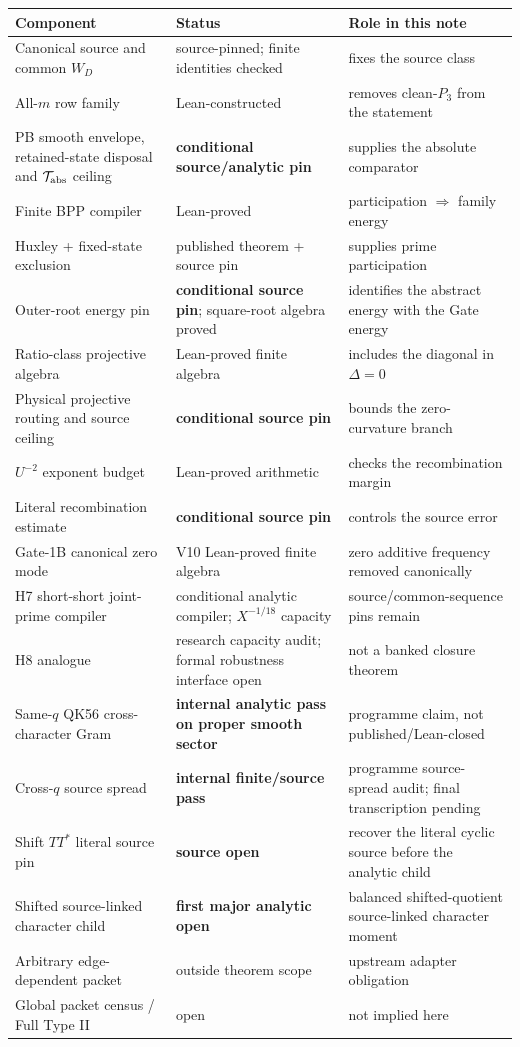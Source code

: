 \documentclass[11pt]{article}
\theoremstyle{definition}
\newcommand{\1}{\mathbf 1}
\begin{document}
\begin{center}
\begin{tabular}{p{} p{} p{}}
\toprule
Component & Status & Role in this note\\
\midrule
Canonical source and common $W_D$ & source-pinned; finite identities checked & fixes the source class\\
All-$m$ row family & Lean-constructed & removes clean-$P_3$ from the statement\\
PB smooth envelope, retained-state disposal and $\mathcal T_{\rm abs}$ ceiling & \textbf{conditional source/analytic pin} & supplies the absolute comparator\\
Finite BPP compiler & Lean-proved & participation $\Rightarrow$ family energy\\
Huxley + fixed-state exclusion & published theorem + source pin & supplies prime participation\\
Outer-root energy pin & \textbf{conditional source pin}; square-root algebra proved & identifies the abstract energy with the Gate energy\\
Ratio-class projective algebra & Lean-proved finite algebra & includes the diagonal in $\Delta=0$\\
Physical projective routing and source ceiling & \textbf{conditional source pin} & bounds the zero-curvature branch\\
$U^{-2}$ exponent budget & Lean-proved arithmetic & checks the recombination margin\\
Literal recombination estimate & \textbf{conditional source pin} & controls the source error\\
Gate-1B canonical zero mode & V10 Lean-proved finite algebra & zero additive frequency removed canonically\\
H7 short-short joint-prime compiler & conditional analytic compiler; $X^{-1/18}$ capacity & source/common-sequence pins remain\\
H8 analogue & research capacity audit; formal robustness interface open & not a banked closure theorem\\
Same-$q$ QK56 cross-character Gram & \textbf{internal analytic pass on proper smooth sector} & programme claim, not published/Lean-closed\\
Cross-$q$ source spread & \textbf{internal finite/source pass} & programme source-spread audit; final transcription pending\\
Shift $TT^*$ literal source pin & \textbf{source open} & recover the literal cyclic source before the analytic child\\
Shifted source-linked character child & \textbf{first major analytic open} & balanced shifted-quotient source-linked character moment\\
Arbitrary edge-dependent packet & outside theorem scope & upstream adapter obligation\\
Global packet census / Full Type II & open & not implied here\\
\bottomrule
\end{tabular}
\end{center}
\end{document}
